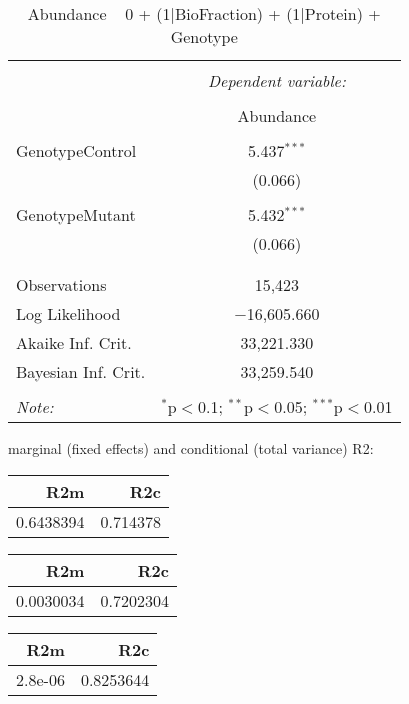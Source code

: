 \documentclass[11pt]{report}
\begin{document}
\begin{table}[!htbp] \centering 
  \caption{Abundance ~ 0 + (1|BioFraction) + (1|Protein) + Genotype} 
  \label{} 
\begin{tabular}{@{\extracolsep{5pt}}lc} 
\\[-1.8ex]\hline 
\hline \\[-1.8ex] 
 & \multicolumn{1}{c}{\textit{Dependent variable:}} \\ 
\cline{2-2} 
\\[-1.8ex] & Abundance \\ 
\hline \\[-1.8ex] 
 GenotypeControl & 5.437$^{***}$ \\ 
  & (0.066) \\ 
  & \\ 
 GenotypeMutant & 5.432$^{***}$ \\ 
  & (0.066) \\ 
  & \\ 
\hline \\[-1.8ex] 
Observations & 15,423 \\ 
Log Likelihood & $-$16,605.660 \\ 
Akaike Inf. Crit. & 33,221.330 \\ 
Bayesian Inf. Crit. & 33,259.540 \\ 
\hline 
\hline \\[-1.8ex] 
\textit{Note:}  & \multicolumn{1}{r}{$^{*}$p$<$0.1; $^{**}$p$<$0.05; $^{***}$p$<$0.01} \\ 
\end{tabular} 
\end{table} 
marginal (fixed effects) and conditional (total variance) R2:

\begin{tabular}{r|r}
\hline
R2m & R2c\\
\hline
0.6438394 & 0.714378\\
\hline
\end{tabular}

\begin{tabular}{r|r}
\hline
R2m & R2c\\
\hline
0.0030034 & 0.7202304\\
\hline
\end{tabular}

\begin{tabular}{r|r}
\hline
R2m & R2c\\
\hline
2.8e-06 & 0.8253644\\
\hline
\end{tabular}
\end{document}
